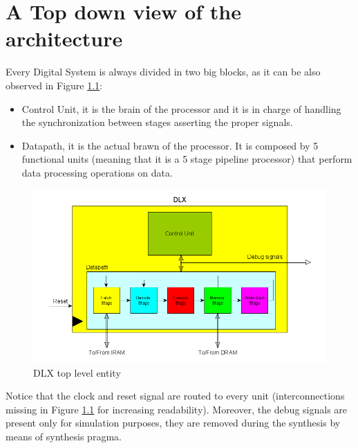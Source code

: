 \chapter{A Top down view of the architecture}
\label{architecure}
Every Digital System is always divided in two big blocks, as it can be also observed in Figure \ref{fig:dlxarch}:
\begin{itemize}
\item Control Unit, it is the brain of the processor and it is in charge of handling the synchronization between stages asserting the proper signals.
\item Datapath, it is the actual brawn of the processor. It is composed by 5 functional units (meaning that it is a 5 stage pipeline processor) that perform data processing operations on data.
\end{itemize}

\begin{figure}[!htbp]
\centering
\captionsetup{justification=centering}
\includegraphics[scale=0.5,angle=0]{./chapters/figures/dlx_top.png}
\caption{DLX top level entity}
\label{fig:dlxarch}
\end{figure}

Notice that the clock and reset signal are routed to every unit (interconnections missing in Figure \ref{fig:dlxarch} for increasing readability). Moreover, the debug signals are present only for simulation purposes, they are removed during the synthesis by means of synthesis pragma.

\newpage
